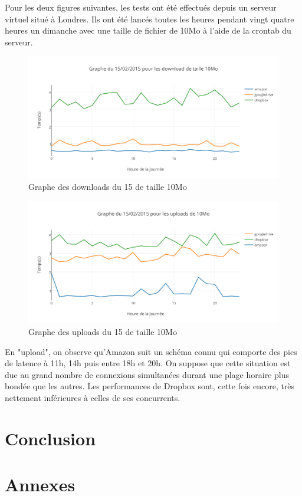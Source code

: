 \documentclass[10pt]{article}
\begin{document}
Pour les deux figures suivantes, les tests ont été effectués depuis un
serveur virtuel situé à Londres. Ils ont été lancés toutes les heures
pendant vingt quatre heures un dimanche avec une taille de fichier de
10Mo à l'aide de la crontab du serveur.


\begin{figure}[h]
\centering
\includegraphics[scale=0.7]{graphe_du_15022015_pour_les_download_de_taille_10mo.png}
\caption{Graphe des downloads du 15 de taille 10Mo}
\end{figure}

\newpage

\begin{figure}[h]
\centering
\includegraphics[scale=0.7]{graphe_du_15022015_pour_les_uploads_de_10mo.png}
\caption{Graphe des uploads du 15 de taille 10Mo}
\end{figure}


En "upload", on observe qu'Amazon suit un schéma connu qui comporte
des pics de latence à 11h, 14h puis entre 18h et 20h. On suppose que
cette situation est due au grand nombre de connexions simultanées
durant une plage horaire plus bondée que les autres. Les performances
de Dropbox sont, cette fois encore, très nettement inférieures à
celles de ses concurrents.



\section{Conclusion}

\section{Annexes}
\end{document}
